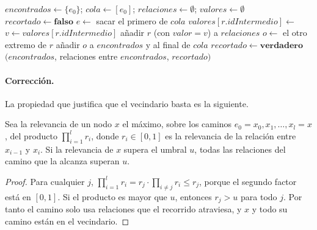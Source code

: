 \begin{algorithm}[htbp]
  \caption{Recorrido del vecindario (\texttt{obtener\_vecindario}).}
  \label{alg:vecindario}
  \begin{algorithmic}[1]
      \State $encontrados \gets \{e_0\}$; $cola \gets [e_0]$; $relaciones \gets \emptyset$; $valores \gets \emptyset$
      \State $recortado \gets \textbf{falso}$
        \State $e \gets$ sacar el primero de $cola$
         
            \State $valores[r.idIntermedio] \gets$ 
          \EndIf
          \State $v \gets valores[r.idIntermedio]$
            \State añadir $r$ (con $valor = v$) a $relaciones$
            \State $o \gets$ el otro extremo de $r$
                \State añadir $o$ a $encontrados$ y al final de $cola$
              \Else
                \State $recortado \gets \textbf{verdadero}$
              \EndIf
            \EndIf
          \EndIf
        \EndFor
      \EndWhile
      \State \Return $(encontrados$, relaciones entre $encontrados$, $recortado)$
    \EndFunction
  \end{algorithmic}
\end{algorithm}

\paragraph{Corrección.} La propiedad que justifica que el vecindario basta es la siguiente.

\begin{proposicion}
\label{prop:vecindario}
Sea la relevancia de un nodo $x$ el máximo, sobre los caminos $e_0=x_0,x_1,\dots,x_l=x$, del producto $\prod_{i=1}^{l} r_i$, donde $r_i\in[0,1]$ es la relevancia de la relación entre $x_{i-1}$ y $x_i$. Si la relevancia de $x$ supera el umbral $u$, todas las relaciones del camino que la alcanza superan $u$.
\end{proposicion}

\begin{proof}
Para cualquier $j$, $\prod_{i=1}^{l} r_i = r_j\cdot\prod_{i\neq j} r_i \le r_j$, porque el segundo factor está en $[0,1]$. Si el producto es mayor que $u$, entonces $r_j > u$ para todo $j$. Por tanto el camino solo usa relaciones que el recorrido atraviesa, y $x$ y todo su camino están en el vecindario.
\end{proof}

